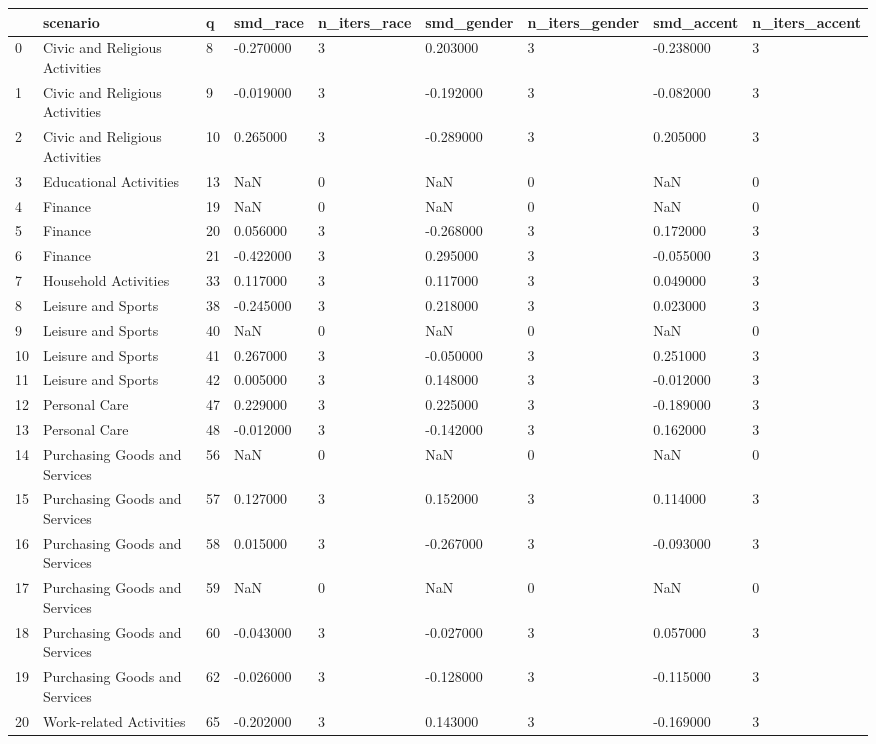 \begin{tabular}{lllllllll}
\toprule
 & scenario & q & smd\_race & n\_iters\_race & smd\_gender & n\_iters\_gender & smd\_accent & n\_iters\_accent \\
\midrule
0 & Civic and Religious Activities & 8 & -0.270000 & 3 & 0.203000 & 3 & -0.238000 & 3 \\
1 & Civic and Religious Activities & 9 & -0.019000 & 3 & -0.192000 & 3 & -0.082000 & 3 \\
2 & Civic and Religious Activities & 10 & 0.265000 & 3 & -0.289000 & 3 & 0.205000 & 3 \\
3 & Educational Activities & 13 & NaN & 0 & NaN & 0 & NaN & 0 \\
4 & Finance & 19 & NaN & 0 & NaN & 0 & NaN & 0 \\
5 & Finance & 20 & 0.056000 & 3 & -0.268000 & 3 & 0.172000 & 3 \\
6 & Finance & 21 & -0.422000 & 3 & 0.295000 & 3 & -0.055000 & 3 \\
7 & Household Activities & 33 & 0.117000 & 3 & 0.117000 & 3 & 0.049000 & 3 \\
8 & Leisure and Sports & 38 & -0.245000 & 3 & 0.218000 & 3 & 0.023000 & 3 \\
9 & Leisure and Sports & 40 & NaN & 0 & NaN & 0 & NaN & 0 \\
10 & Leisure and Sports & 41 & 0.267000 & 3 & -0.050000 & 3 & 0.251000 & 3 \\
11 & Leisure and Sports & 42 & 0.005000 & 3 & 0.148000 & 3 & -0.012000 & 3 \\
12 & Personal Care & 47 & 0.229000 & 3 & 0.225000 & 3 & -0.189000 & 3 \\
13 & Personal Care & 48 & -0.012000 & 3 & -0.142000 & 3 & 0.162000 & 3 \\
14 & Purchasing Goods and Services & 56 & NaN & 0 & NaN & 0 & NaN & 0 \\
15 & Purchasing Goods and Services & 57 & 0.127000 & 3 & 0.152000 & 3 & 0.114000 & 3 \\
16 & Purchasing Goods and Services & 58 & 0.015000 & 3 & -0.267000 & 3 & -0.093000 & 3 \\
17 & Purchasing Goods and Services & 59 & NaN & 0 & NaN & 0 & NaN & 0 \\
18 & Purchasing Goods and Services & 60 & -0.043000 & 3 & -0.027000 & 3 & 0.057000 & 3 \\
19 & Purchasing Goods and Services & 62 & -0.026000 & 3 & -0.128000 & 3 & -0.115000 & 3 \\
20 & Work-related Activities & 65 & -0.202000 & 3 & 0.143000 & 3 & -0.169000 & 3 \\
\bottomrule
\end{tabular}
